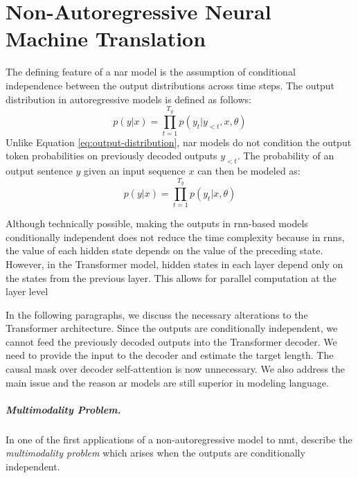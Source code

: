 


\chapter{Non-Autoregressive Neural Machine Translation}

The defining feature of a \ac{nar} model is the assumption of
conditional independence between the output distributions across time
steps. The output distribution in autoregressive models is defined as follows:
%
\begin{equation}
  p(y|x) = \prod_{t=1}^{T_y}p(y_t|y_{<t},x,\theta)
  \label{eq:output-distribution}
\end{equation}
%
Unlike Equation \ref{eq:output-distribution}, \Ac{nar} models do not condition
the output token probabilities on previously decoded outputs $y_{<t}$.  The
probability of an output sentence $y$ given an input sequence $x$ can then be
modeled as:
%
\begin{equation}
  p(y|x) = \prod_{t=1}^{T_y}p(y_t|x,\theta)
  \label{eq:nat-output-distribution}
\end{equation}

Although technically possible, making the outputs in \acs{rnn}-based models
conditionally independent does not reduce the time complexity because in
\acsp{rnn}, the value of each hidden state depends on the value of the
preceding state. However, in the Transformer model, hidden states in each layer
depend only on the states from the previous layer. This allows for parallel
computation at the layer level


In the following paragraphs, we discuss the necessary alterations to the
Transformer architecture. Since the outputs are conditionally independent, we
cannot feed the previously decoded outputs into the Transformer decoder. We
need to provide the input to the decoder and estimate the target length. The
causal mask over decoder self-attention is now unnecessary. We also address the
main issue and the reason \ac{ar} models are still superior in modeling
language.

\paragraph{Multimodality Problem.} In one of the first applications of a
non-autoregressive model to \ac{nmt}, \citet{gu2017nonautoregressive} describe
the \emph{multimodality problem} which arises when the outputs are
conditionally independent.

